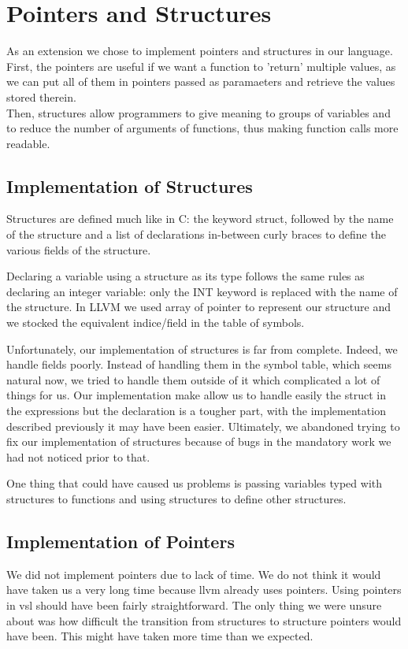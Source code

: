 \documentclass{article}
\begin{document}
\section{Pointers and Structures}
As an extension we chose to implement pointers and structures in our language. First, the pointers are useful
if we want a function to 'return' multiple values, as we can put all of them in pointers passed as paramaeters and retrieve the values stored therein.\\
Then, structures allow programmers to give meaning to groups of variables and to reduce the number of arguments of functions, thus making function calls more readable. 

\subsection{Implementation of Structures}

Structures are defined much like in C: the keyword struct, followed by the name of the structure and a list of declarations in-between curly braces to define the various fields of the structure.

Declaring a variable using a structure as its type follows the same rules as declaring an integer variable: only the INT keyword is replaced with the name of the structure.
In LLVM we used array of pointer to represent our structure and we stocked the equivalent indice/field in the table of symbols. 

Unfortunately, our implementation of structures is far from complete. Indeed, we handle fields poorly. Instead of handling them in the symbol table, which seems natural now, we tried to handle them outside of it which complicated a lot of things for us. Our implementation make allow us to handle easily the struct in the expressions but the declaration is a tougher part, with the implementation described previously it may have been easier. Ultimately, we abandoned trying to fix our implementation of structures because of bugs in the mandatory work we had not noticed prior to that.

One thing that could have caused us problems is passing variables typed with structures to functions and using structures to define other structures.

\subsection{Implementation of Pointers}

We did not implement pointers due to lack of time. We do not think it would have taken us a very long time because llvm already uses pointers. Using pointers in vsl should have been fairly straightforward. The only thing we were unsure about was how difficult the transition from structures to structure pointers would have been. This might have taken more time than we expected.
\end{document}

